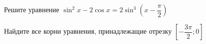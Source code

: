 \begin{ex}
	\begin{condition}
		\begin{enumcols}[label=\asbuk*)]
			\item Решите уравнение \( \sin^2 x - 2\cos x = 2\sin^3{\left(x - \dfrac{\pi}{2}\right)} \)
			\item Найдите все корни уравнения, принадлежащие отрезку \( \left[-\dfrac{3\pi}{2};0\right] \)
		\end{enumcols}
	\end{condition}
\end{ex}